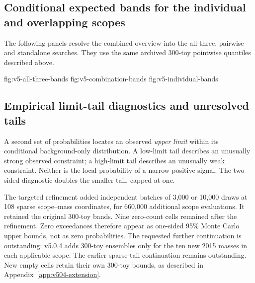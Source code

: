 \subsection{Conditional expected bands for the individual and overlapping scopes}
The following panels resolve the combined overview into the all-three,
pairwise and standalone searches. They use the same archived 300-toy
pointwise quantiles described above.

{fig:v5-all-three-bands}
{fig:v5-combination-bands}
{fig:v5-individual-bands}
\FloatBarrier

\subsection{Empirical limit-tail diagnostics and unresolved tails}
\label{sec:v5-tail-results}

A second set of probabilities locates an observed \emph{upper limit} within its
conditional background-only distribution. A low-limit tail describes an
unusually strong observed constraint; a high-limit tail describes an unusually
weak constraint. Neither is the local probability of a narrow positive signal.
The two-sided diagnostic doubles the smaller tail, capped at one.

The targeted refinement added independent batches of 3,000 or 10,000 draws at
108 sparse scope--mass coordinates, for 660,000 additional scope evaluations.
It retained the original 300-toy bands. Nine zero-count cells remained after
the refinement. Zero exceedances therefore appear as one-sided 95\% Monte Carlo
upper bounds, not as zero probabilities. The requested further continuation
is outstanding: v5.0.4 adds 300-toy ensembles only for the ten new 2015 masses in each
applicable scope. The earlier sparse-tail continuation remains outstanding.
New empty cells retain their own 300-toy bounds, as described in
Appendix~\ref{app:v504-extension}.

